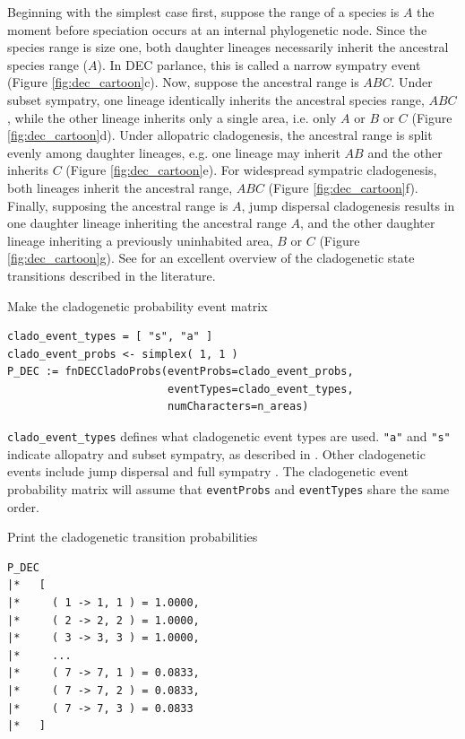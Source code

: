Beginning with the simplest case first, suppose the range of a species is $A$ the moment before speciation occurs at an internal phylogenetic node.
Since the species range is size one, both daughter lineages necessarily inherit the ancestral species range ($A$).
In DEC parlance, this is called a narrow sympatry event (Figure \ref{fig:dec_cartoon}c).
Now, suppose the ancestral range is $ABC$.
Under subset sympatry, one lineage identically inherits the ancestral species range, $ABC$, while the other lineage inherits only a single area, i.e. only $A$ or $B$ or $C$ (Figure \ref{fig:dec_cartoon}d).
Under allopatric cladogenesis, the ancestral range is split evenly among daughter lineages, e.g. one lineage may inherit $AB$ and the other inherits $C$ (Figure \ref{fig:dec_cartoon}e).
For widespread sympatric cladogenesis, both lineages inherit the ancestral range, $ABC$ (Figure \ref{fig:dec_cartoon}f).
Finally, supposing the ancestral range is $A$, jump dispersal cladogenesis results in one daughter lineage inheriting the ancestral range $A$, and the other daughter lineage inheriting a previously uninhabited area, $B$ or $C$ (Figure \ref{fig:dec_cartoon}g).
See \citet{Matzke2012} for an excellent overview of the cladogenetic state transitions described in the literature.

Make the cladogenetic probability event matrix

\begin{snugshade}
\begin{lstlisting}
clado_event_types = [ "s", "a" ]
clado_event_probs <- simplex( 1, 1 )
P_DEC := fnDECCladoProbs(eventProbs=clado_event_probs,
                         eventTypes=clado_event_types,
                         numCharacters=n_areas)
\end{lstlisting}
\end{snugshade}

{\tt clado\_event\_types} defines what cladogenetic event types are used.
{\tt "a"} and {\tt "s"} indicate allopatry and subset sympatry, as described in \citep{Ree2005}.
Other cladogenetic events include jump dispersal \citep[{\tt "j"};][]{Matzke2014} and full sympatry \citep[{\tt "f"};][]{Landis2013a}.
The cladogenetic event probability matrix will assume that {\tt eventProbs} and {\tt eventTypes} share the same order.

Print the cladogenetic transition probabilities

\begin{snugshade}
\begin{lstlisting}
P_DEC
|*   [
|*     ( 1 -> 1, 1 ) = 1.0000,
|*     ( 2 -> 2, 2 ) = 1.0000,
|*     ( 3 -> 3, 3 ) = 1.0000,
|*     ...
|*     ( 7 -> 7, 1 ) = 0.0833,
|*     ( 7 -> 7, 2 ) = 0.0833,
|*     ( 7 -> 7, 3 ) = 0.0833
|*   ]
\end{lstlisting}
\end{snugshade}


